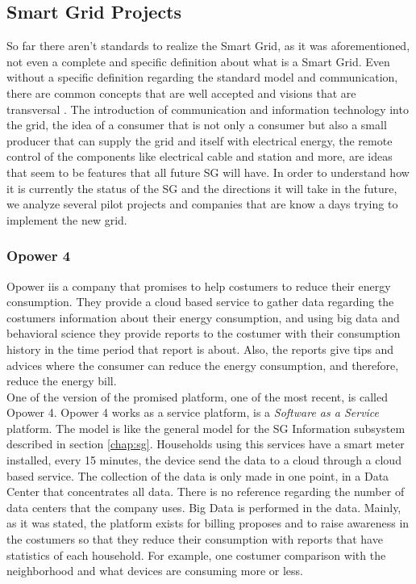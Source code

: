 \subsection{Smart Grid Projects}
So far there aren't standards to realize the Smart Grid, as it was aforementioned, not even a complete and specific definition about what is a Smart Grid. Even without a specific definition regarding the standard model and communication, there  are common concepts that are well accepted and visions that are transversal . The introduction of communication and information technology into the grid, the idea of a consumer that is not only a consumer but also a small producer that can supply the grid and itself with electrical energy, the remote control of the components like electrical cable and station and more, are ideas that seem to be features that all future SG will have. In order to understand how it is currently the status of the SG and the directions it will take in the future, we analyze several pilot projects and companies that are know a days trying to implement the new grid.
\subsubsection{Opower 4}
Opower\cite{website:opower} iis a company that promises to help costumers to reduce their energy consumption. They provide a cloud based service to gather data regarding the costumers information about their energy consumption, and using big data and behavioral science they provide reports to the costumer with their consumption history in the time period that report is about. Also, the reports give tips and advices where the consumer can reduce the energy consumption, and therefore, reduce the energy bill.\\
One of the version of the promised platform, one of the most recent, is called Opower 4. Opower 4 works as a service platform, is a \textit{Software as a Service} platform. The model is like the general model for the SG Information subsystem described in section \ref{chap:sg}. Households using this services have a smart meter installed, every 15 minutes, the device send the data to a cloud through a cloud based service. The collection of the data is only made in one point, in a Data Center that concentrates all data. There is no reference regarding the number of data centers that the company uses. Big Data is performed in the data. Mainly, as it was stated, the platform exists for billing proposes and to raise awareness in the costumers so that they reduce their consumption with reports that have statistics of each household. For example, one costumer comparison with the neighborhood and what devices are consuming more or less.
